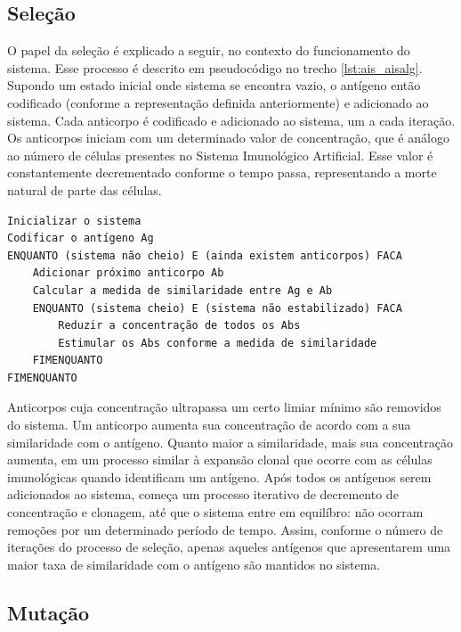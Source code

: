 \subsection{Seleção}

O papel da seleção é explicado a seguir, no contexto do funcionamento do sistema. Esse processo é descrito em pseudocódigo no trecho \ref{lst:ais_aisalg}. Supondo um estado inicial onde sistema se encontra vazio, o antígeno então codificado (conforme a representação definida anteriormente) e adicionado ao sistema. Cada anticorpo é codificado e adicionado ao sistema, um a cada iteração. Os anticorpos iniciam com um determinado valor de concentração, que é análogo ao número de células presentes no Sistema Imunológico Artificial. Esse valor é constantemente decrementado conforme o tempo passa, representando a morte natural de parte das células.

\vspace{1cm}
\begin{lstlisting}[caption=Pseudo código de um Sistema Imunológico Artificial \cite{Aickelin2005},label=lst:ais_aisalg]
Inicializar o sistema
Codificar o antígeno Ag
ENQUANTO (sistema não cheio) E (ainda existem anticorpos) FACA
    Adicionar próximo anticorpo Ab
    Calcular a medida de similaridade entre Ag e Ab
    ENQUANTO (sistema cheio) E (sistema não estabilizado) FACA
        Reduzir a concentração de todos os Abs
        Estimular os Abs conforme a medida de similaridade
    FIMENQUANTO
FIMENQUANTO
\end{lstlisting}

Anticorpos cuja concentração ultrapassa um certo limiar mínimo são removidos do sistema. Um anticorpo aumenta sua concentração de acordo com a sua similaridade com o antígeno. Quanto maior a similaridade, mais sua concentração aumenta, em um processo similar à expansão clonal que ocorre com as células imunológicas quando identificam um antígeno. Após todos os antígenos serem adicionados ao sistema, começa um processo iterativo de decremento de concentração e clonagem, até que o sistema entre em equilíbro: não ocorram remoções por um determinado período de tempo. Assim, conforme o número de iterações do processo de seleção, apenas aqueles antígenos que apresentarem uma maior taxa de similaridade com o antígeno são mantidos no sistema.

\subsection{Mutação}

